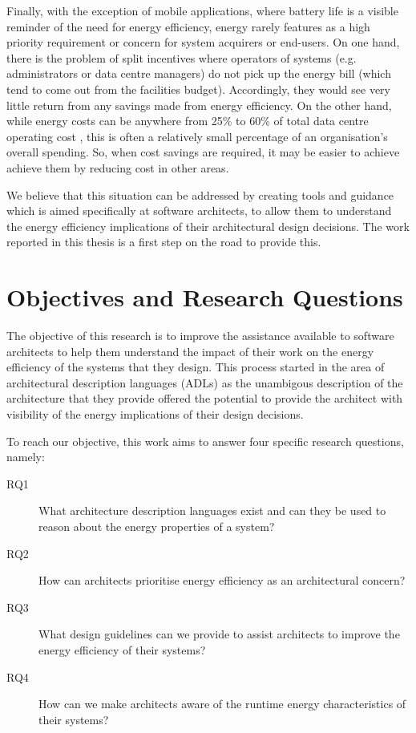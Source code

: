 Finally, with the exception of mobile applications, where battery life is a visible reminder of the need for energy efficiency, energy rarely features as a high priority requirement or concern for system acquirers or end-users. On one hand, there is the problem of split incentives where operators of systems (e.g. administrators or data centre managers) do not pick up the energy bill (which tend to come out from the facilities budget). Accordingly, they would see very little return from any savings made from energy efficiency. On the other hand, while energy costs can be anywhere from 25\% to 60\% of total data centre operating cost \cite{techuk2013-dcpower}, this is often a relatively small percentage of an organisation's overall spending. So, when cost savings are required, it may be easier to achieve achieve them by reducing cost in other areas.

We believe that this situation can be addressed by creating tools and guidance which is aimed specifically at software architects, to allow them to understand the energy efficiency implications of their architectural design decisions.  The work reported in this thesis is a first step on the road to provide this.

\section{Objectives and Research Questions}

The objective of this research is to improve the assistance available to software architects to help them understand the impact of their work on the energy efficiency of the systems that they design.  This process started in the area of architectural description languages (ADLs) as the unambigous description of the architecture that they provide offered the potential to provide the architect with visibility of the energy implications of their design decisions.

To reach our objective, this work aims to answer four specific research questions, namely:
\nopagebreak
\begin{description}
\item [RQ1] What architecture description languages exist and can they be used to reason about the energy properties of a system?
\item [RQ2] How can architects prioritise energy efficiency as an architectural concern?
\item [RQ3] What design guidelines can we provide to assist architects to improve the energy efficiency of their systems?
\item [RQ4] How can we make architects aware of the runtime energy characteristics of their systems?
\end{description}

